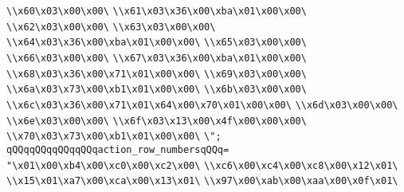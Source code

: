 \verb|\\x60\x03\x00\x00\|\newline
\verb|\\x61\x03\x36\x00\xba\x01\x00\x00\|\newline
\verb|\\x62\x03\x00\x00\|\newline
\verb|\\x63\x03\x00\x00\|\newline
\verb|\\x64\x03\x36\x00\xba\x01\x00\x00\|\newline
\verb|\\x65\x03\x00\x00\|\newline
\verb|\\x66\x03\x00\x00\|\newline
\verb|\\x67\x03\x36\x00\xba\x01\x00\x00\|\newline
\verb|\\x68\x03\x36\x00\x71\x01\x00\x00\|\newline
\verb|\\x69\x03\x00\x00\|\newline
\verb|\\x6a\x03\x73\x00\xb1\x01\x00\x00\|\newline
\verb|\\x6b\x03\x00\x00\|\newline
\verb|\\x6c\x03\x36\x00\x71\x01\x64\x00\x70\x01\x00\x00\|\newline
\verb|\\x6d\x03\x00\x00\|\newline
\verb|\\x6e\x03\x00\x00\|\newline
\verb|\\x6f\x03\x13\x00\x4f\x00\x00\x00\|\newline
\verb|\\x70\x03\x73\x00\xb1\x01\x00\x00\|\newline
\verb|\";|\newline
\verb|qQQqqQQqqQQqqQQqaction_row_numbersqQQq=|\newline
\verb|"\x01\x00\xb4\x00\xc0\x00\xc2\x00\|\newline
\verb|\\xc6\x00\xc4\x00\xc8\x00\x12\x01\|\newline
\verb|\\x15\x01\xa7\x00\xca\x00\x13\x01\|\newline
\verb|\\x97\x00\xab\x00\xaa\x00\x0f\x01\|\newline
